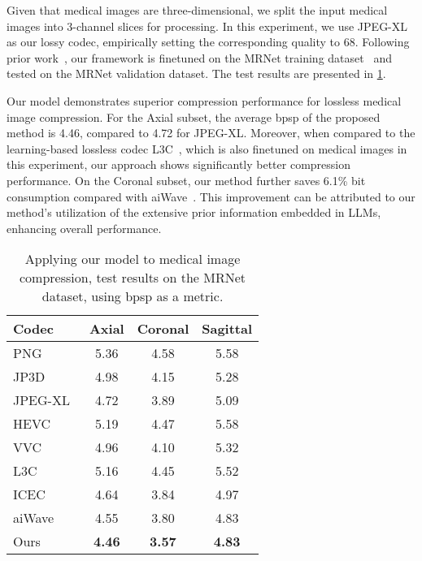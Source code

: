 Given that medical images are three-dimensional, we split the input medical images into 3-channel slices for processing. In this experiment, we use JPEG-XL as our lossy codec, empirically setting the corresponding quality to 68. Following prior work~\cite{chen2022exploiting}, our framework is finetuned on the MRNet training dataset~\cite{bien2018deep} and tested on the MRNet validation dataset. The test results are presented in \cref{tab:medical-results}. 

Our model demonstrates superior compression performance for lossless medical image compression. For the Axial subset, the average bpsp of the proposed method is 4.46, compared to 4.72 for JPEG-XL. 
Moreover, when compared to the learning-based lossless codec L3C~\cite{mentzer2019practical}, which is also finetuned on medical images in this experiment, our approach shows significantly better compression performance. On the Coronal subset, our method further saves 6.1\% bit consumption compared with aiWave~\cite{xue2022aiwave}.
This improvement can be attributed to our method's utilization of the extensive prior information embedded in LLMs, enhancing overall performance.



\begin{table}[t]
    \centering
    \tabcolsep=0.3cm
        \begin{tabular}{lccc}
            \toprule[2pt]
            Codec &Axial &Coronal &Sagittal\\
            \midrule[1pt]
            PNG~\cite{boutell1997png}  &5.36 &4.58 &5.58\\
            JP3D~\cite{bruylants2009jp3d} &4.98 &4.15 &5.28\\
            JPEG-XL~\cite{alakuijala2019jpeg} &4.72 &3.89 &5.09\\
            HEVC~\cite{sullivan2012overview} &5.19 &4.47 &5.58\\
            VVC~\cite{Bross_2021_TCSVT_VVC} &4.96 &4.10 &5.32\\
            L3C~\cite{mentzer2019practical} &5.16 &4.45 &5.52\\
            ICEC~\cite{chen2022exploiting} &4.64 &3.84 &4.97\\
            aiWave~\cite{xue2022aiwave} &4.55 &3.80 &4.83\\
            \midrule[1pt]
            Ours &\bf4.46 &\bf3.57 &\bf4.83 \\
            \bottomrule[2pt]
        \end{tabular}
        \caption{Applying our model to medical image compression, test results on the MRNet dataset, using bpsp as a metric.}
        \label{tab:medical-results}
\end{table}
